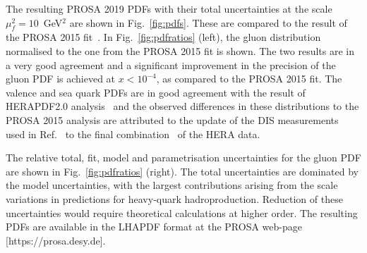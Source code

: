 \documentclass[12pt]{article}
\begin{document}
The resulting PROSA 2019 PDFs with their total uncertainties at the scale $\mu^2_f=10$~GeV$^2$ are shown in Fig.~\ref{fig:pdfs}. These are compared to the result of the PROSA 2015 fit~\cite{Zenaiev:2015rfa}. In Fig.~\ref{fig:pdfratios} (left), the gluon distribution 
normalised to the one from the PROSA 2015 fit is shown. The two results are in a very good agreement and a significant improvement 
in the precision of the gluon PDF is achieved at $x < 10^{-4}$, as compared to the PROSA 2015 fit. 
The valence and sea quark PDFs are in good agreement with the result of HERAPDF2.0 analysis~\cite{Abramowicz:2015mha} and the 
observed differences in these distributions to the PROSA 2015 analysis are attributed to the update of the DIS measurements~\cite{Aaron:2009aa} used in Ref.~\cite{Zenaiev:2015rfa} to the final combination~\cite{Abramowicz:2015mha} of the HERA data.

The relative total, fit, model and parametrisation uncertainties for the gluon PDF are shown in Fig.~\ref{fig:pdfratios} (right). 
The total uncertainties are dominated by the model uncertainties, with the largest contributions arising from the scale 
variations in predictions for heavy-quark hadroproduction. Reduction of these uncertainties would require theoretical calculations at higher order.  The resulting PDFs are available in the LHAPDF format at the PROSA web-page [https://prosa.desy.de].
\end{document}
